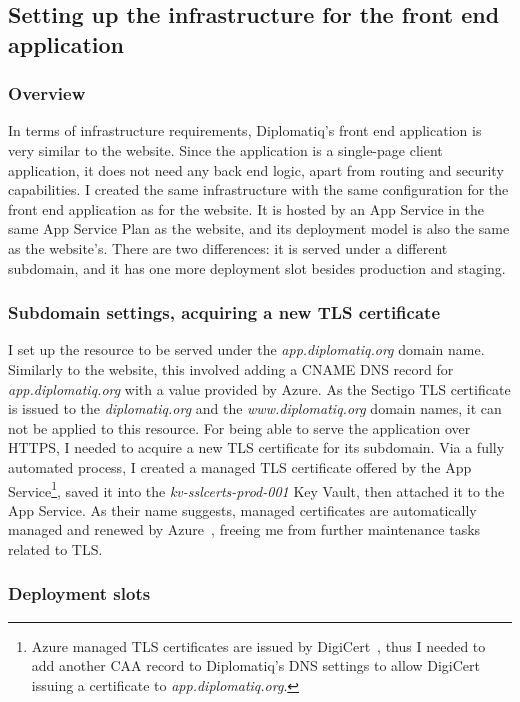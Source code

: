\subsection{Setting up the infrastructure for the front end application}

\subsubsection{Overview}

In terms of infrastructure requirements, Diplomatiq's front end application is very similar to the website. Since the application is a single-page client application, it does not need any back end logic, apart from routing and security capabilities. I created the same infrastructure with the same configuration for the front end application as for the website. It is hosted by an App Service in the same App Service Plan as the website, and its deployment model is also the same as the website's. There are two differences: it is served under a different subdomain, and it has one more deployment slot besides production and staging.

\subsubsection{Subdomain settings, acquiring a new TLS certificate}

I set up the resource to be served under the \emph{app.diplomatiq.org} domain name. Similarly to the website, this involved adding a CNAME DNS record for \emph{app.diplomatiq.org} with a value provided by Azure. As the Sectigo TLS certificate is issued to the \emph{diplomatiq.org} and the \emph{www.diplomatiq.org} domain names, it can not be applied to this resource. For being able to serve the application over HTTPS, I needed to acquire a new TLS certificate for its subdomain. Via a fully automated process, I created a managed TLS certificate offered by the App Service\footnote{Azure managed TLS certificates are issued by DigiCert~\cite{digicert-website}, thus I needed to add another CAA record to Diplomatiq's DNS settings to allow DigiCert issuing a certificate to \emph{app.diplomatiq.org}.}, saved it into the \emph{kv-sslcerts-prod-001} Key Vault, then attached it to the App Service. As their name suggests, managed certificates are automatically managed and renewed by Azure~\cite{managed-certificates}, freeing me from further maintenance tasks related to TLS.

\subsubsection{Deployment slots}

